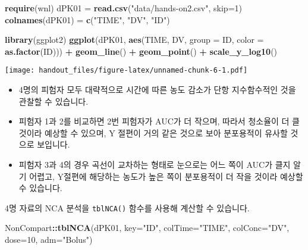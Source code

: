 \documentclass[
  9pt,
]{krantz}
\newenvironment{Shaded}{\begin{snugshade}}{\end{snugshade}}
\newcommand{\DataTypeTok}[1]{\textcolor[rgb]{0.13,0.29,0.53}{#1}}
\newcommand{\DecValTok}[1]{\textcolor[rgb]{0.00,0.00,0.81}{#1}}
\newcommand{\KeywordTok}[1]{\textcolor[rgb]{0.13,0.29,0.53}{\textbf{#1}}}
\newcommand{\NormalTok}[1]{#1}
\newcommand{\OperatorTok}[1]{\textcolor[rgb]{0.81,0.36,0.00}{\textbf{#1}}}
\newcommand{\StringTok}[1]{\textcolor[rgb]{0.31,0.60,0.02}{#1}}
\providecommand{\tightlist}{%
  \setlength{\itemsep}{0pt}\setlength{\parskip}{0pt}}
\begin{document}
\begin{Shaded}
\begin{Highlighting}[]
\KeywordTok{require}\NormalTok{(wnl)}
\NormalTok{dPK01 =}\StringTok{ }\KeywordTok{read.csv}\NormalTok{(}\StringTok{"data/hands-on2.csv"}\NormalTok{, }\DataTypeTok{skip=}\DecValTok{1}\NormalTok{)}
\KeywordTok{colnames}\NormalTok{(dPK01) =}\StringTok{ }\KeywordTok{c}\NormalTok{(}\StringTok{"TIME"}\NormalTok{, }\StringTok{"DV"}\NormalTok{, }\StringTok{"ID"}\NormalTok{)}

\KeywordTok{library}\NormalTok{(ggplot2)}
\KeywordTok{ggplot}\NormalTok{(dPK01, }\KeywordTok{aes}\NormalTok{(TIME, DV, }\DataTypeTok{group =}\NormalTok{ ID, }\DataTypeTok{color =} \KeywordTok{as.factor}\NormalTok{(ID))) }\OperatorTok{+}
\StringTok{  }\KeywordTok{geom_line}\NormalTok{() }\OperatorTok{+}\StringTok{ }\KeywordTok{geom_point}\NormalTok{() }\OperatorTok{+}\StringTok{ }\KeywordTok{scale_y_log10}\NormalTok{()}
\end{Highlighting}
\end{Shaded}

\texttt{[image: handout\_files/figure-latex/unnamed-chunk-6-1.pdf]}

\begin{itemize}
\tightlist
\item
  4명의 피험자 모두 대략적으로 시간에 따른 농도 감소가 단항 지수함수적인 것을 관찰할 수
  있습니다.\\
\item
  피험자 1과 2를 비교하면 2번 피험자가 AUC가 더 작으며, 따라서 청소율이 더 클 것이라
  예상할 수 있으며, Y 절편이 거의 같은 것으로 보아 분포용적이 유사할 것으로 보입니다.\\
\item
  피험자 3과 4의 경우 곡선이 교차하는 형태로 눈으로는 어느 쪽이 AUC가 클지 알기 어렵고, Y절편에
  해당하는 농도가 높은 쪽이 분포용적이 더 작을 것이라 예상할 수 있습니다.
\end{itemize}

4명 자료의 NCA 분석을 \texttt{tblNCA()} 함수를 사용해 계산할 수 있습니다.

\begin{Shaded}
\begin{Highlighting}[]
\NormalTok{NonCompart}\OperatorTok{::}\KeywordTok{tblNCA}\NormalTok{(dPK01, }\DataTypeTok{key=}\StringTok{"ID"}\NormalTok{, }\DataTypeTok{colTime=}\StringTok{"TIME"}\NormalTok{, }\DataTypeTok{colConc=}\StringTok{"DV"}\NormalTok{, }\DataTypeTok{dose=}\DecValTok{10}\NormalTok{, }\DataTypeTok{adm=}\StringTok{"Bolus"}\NormalTok{)}
\end{Highlighting}
\end{Shaded}
\end{document}
